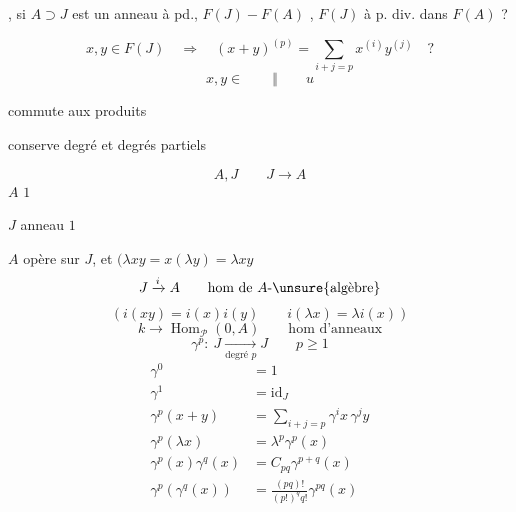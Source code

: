 
, si $A\supset J$ est un anneau à pd.,  $F(J)-F(A)$ ,  $F(J)$ à p. div. dans $F(A)$ ?


\[
x,y\in F(J)\quad\Longrightarrow\quad
(x+y)^{(p)}=\sum_{i+j=p}x^{(i)}y^{(j)}\quad?
\]
\[x,y\in\qquad\Vert\qquad u\]

commute aux produits\par
conserve degré et degrés partiels

\[
A,J\qquad J\longrightarrow A
\]
$A$    $1$\par
$J$ anneau  $1$\par
$A$ opère sur $J$, et $(\lambda xy=x(\lambda y)=\lambda xy$
\[
J\xrightarrow{i} A\qquad\text{hom de }A\text{-}\unsure{\text{algèbre}}
\]
\[
(i(xy)=i(x)i(y)\qquad i(\lambda x)=\lambda i(x))
\]
\[
k\longrightarrow\operatorname{Hom}_{\mathcal P}(0,A)\qquad\text{hom d'anneaux}
\]
\[
\gamma^p:\ J\xrightarrow[\text{degré }p]{}J\qquad p\geq1
\]
\[
\begin{aligned}
\gamma^0&=1\\
\gamma^1&=\mathrm{id}_J\\
\gamma^p(x+y)&=\sum_{i+j=p}\gamma^i x\,\gamma^j y\\
\gamma^p(\lambda x)&=\lambda^p\gamma^p(x)\\
\gamma^p(x)\gamma^q(x)&=C_{pq}\gamma^{p+q}(x)\\
\gamma^p(\gamma^q(x))&=\frac{(pq)!}{(p!)^q q!}\gamma^{pq}(x)
\end{aligned}
\]

\uline{}

